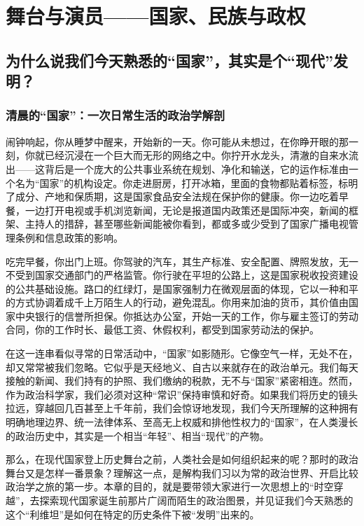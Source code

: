 \part{舞台与演员——国家、民族与政权}

\chapter{为什么说我们今天熟悉的“国家”，其实是个“现代”发明？}

\section{清晨的“国家”：一次日常生活的政治学解剖}

闹钟响起，你从睡梦中醒来，开始新的一天。你可能从未想过，在你睁开眼的那一刻，你就已经沉浸在一个巨大而无形的网络之中。你拧开水龙头，清澈的自来水流出——这背后是一个庞大的公共事业系统在规划、净化和输送，它的运作标准由一个名为“国家”的机构设定。你走进厨房，打开冰箱，里面的食物都贴着标签，标明了成分、产地和保质期，这是国家食品安全法规在保护你的健康。你一边吃着早餐，一边打开电视或手机浏览新闻，无论是报道国内政策还是国际冲突，新闻的框架、主持人的措辞，甚至哪些新闻能被你看到，都或多或少受到了国家广播电视管理条例和信息政策的影响。

吃完早餐，你出门上班。你驾驶的汽车，其生产标准、安全配置、牌照发放，无一不受到国家交通部门的严格监管。你行驶在平坦的公路上，这是国家税收投资建设的公共基础设施。路口的红绿灯，是国家强制力在微观层面的体现，它以一种和平的方式协调着成千上万陌生人的行动，避免混乱。你用来加油的货币，其价值由国家中央银行的信誉所担保。你抵达办公室，开始一天的工作，你与雇主签订的劳动合同，你的工作时长、最低工资、休假权利，都受到国家劳动法的保护。

在这一连串看似寻常的日常活动中，“国家”如影随形。它像空气一样，无处不在，却又常常被我们忽略。它似乎是天经地义、自古以来就存在的政治单元。我们每天接触的新闻、我们持有的护照、我们缴纳的税款，无不与“国家”紧密相连。然而，作为政治科学家，我们必须对这种“常识”保持审慎和好奇。如果我们将历史的镜头拉远，穿越回几百甚至上千年前，我们会惊讶地发现，我们今天所理解的这种拥有明确地理边界、统一法律体系、至高无上权威和排他性权力的“国家”，在人类漫长的政治历史中，其实是一个相当“年轻”、相当“现代”的产物。

那么，在现代国家登上历史舞台之前，人类社会是如何组织起来的呢？那时的政治舞台又是怎样一番景象？理解这一点，是解构我们习以为常的政治世界、开启比较政治学之旅的第一步。本章的目的，就是要带领大家进行一次思想上的“时空穿越”，去探索现代国家诞生前那片广阔而陌生的政治图景，并见证我们今天熟悉的这个“利维坦”是如何在特定的历史条件下被“发明”出来的。

